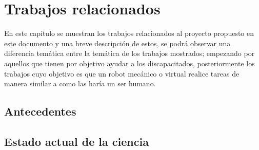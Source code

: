 
\chapter{Trabajos relacionados}
\label{sec:chapter2}

En este cap\'itulo se muestran los trabajos relacionados al proyecto propuesto
 en este documento y una breve descripci\'on de estos, se podr\'a observar una
 diferencia tem\'atica entre la tem\'atica de los trabajos mostrados; empezando 
 por aquellos que tienen por objetivo ayudar a los discapacitados, 
 posteriormente los trabajos cuyo objetivo es que un robot mec\'anico o virtual 
 realice tareas de manera similar a como las har\'ia un ser humano.
 

\section{Antecedentes}






\section{Estado actual de la ciencia}











